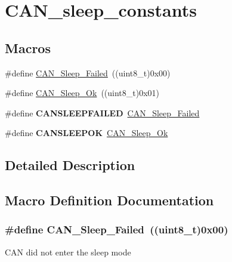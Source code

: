 \hypertarget{group___c_a_n__sleep__constants}{\section{C\-A\-N\-\_\-sleep\-\_\-constants}
\label{group___c_a_n__sleep__constants}
}
\subsection*{Macros}
\begin{DoxyCompactItemize}
\item 
\#define \hyperlink{group___c_a_n__sleep__constants_ga169500ab7169c4e9c7e9e4ea34b3e070}{C\-A\-N\-\_\-\-Sleep\-\_\-\-Failed}~((uint8\-\_\-t)0x00)
\item 
\#define \hyperlink{group___c_a_n__sleep__constants_gaf5c4e9d32d4faff9d0bf61e153ed7998}{C\-A\-N\-\_\-\-Sleep\-\_\-\-Ok}~((uint8\-\_\-t)0x01)
\item 
\hypertarget{group___c_a_n__sleep__constants_ga4d5e8e0c57febb024b30e5f24866a117}{\#define {\bfseries C\-A\-N\-S\-L\-E\-E\-P\-F\-A\-I\-L\-E\-D}~\hyperlink{group___c_a_n__sleep__constants_ga169500ab7169c4e9c7e9e4ea34b3e070}{C\-A\-N\-\_\-\-Sleep\-\_\-\-Failed}}\label{group___c_a_n__sleep__constants_ga4d5e8e0c57febb024b30e5f24866a117}

\item 
\hypertarget{group___c_a_n__sleep__constants_ga2f8d34f8f60a6c84d8e436d4d37708ab}{\#define {\bfseries C\-A\-N\-S\-L\-E\-E\-P\-O\-K}~\hyperlink{group___c_a_n__sleep__constants_gaf5c4e9d32d4faff9d0bf61e153ed7998}{C\-A\-N\-\_\-\-Sleep\-\_\-\-Ok}}\label{group___c_a_n__sleep__constants_ga2f8d34f8f60a6c84d8e436d4d37708ab}

\end{DoxyCompactItemize}


\subsection{Detailed Description}


\subsection{Macro Definition Documentation}
\hypertarget{group___c_a_n__sleep__constants_ga169500ab7169c4e9c7e9e4ea34b3e070}{
\subsubsection[{C\-A\-N\-\_\-\-Sleep\-\_\-\-Failed}]{\setlength{\rightskip}{0pt plus 5cm}\#define C\-A\-N\-\_\-\-Sleep\-\_\-\-Failed~((uint8\-\_\-t)0x00)}}\label{group___c_a_n__sleep__constants_ga169500ab7169c4e9c7e9e4ea34b3e070}
C\-A\-N did not enter the sleep mode 

